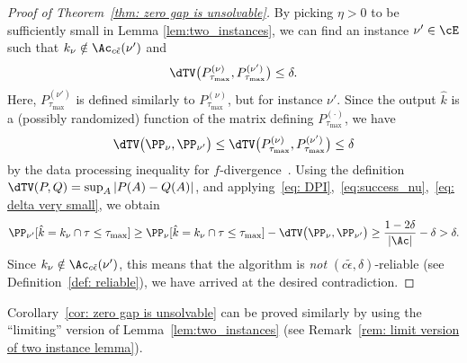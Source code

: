 \begin{proof}[Proof of Theorem~\ref{thm: zero gap is unsolvable}]
By picking $\eta > 0$ to be sufficiently small in Lemma \ref{lem:two_instances}, we can find an instance $\nu' \in \cE$ such that $k_{\nu} \notin \Ac_{c\tilde{\epsilon}}(\nu')$ and
\begin{equation}
    \dTV\big( P_{\tau_{\max}}^{(\nu)}, P_{\tau_{\max}}^{(\nu')} \big) \le \delta.
\end{equation}
Here, $P_{\tau_{\max}}^{(\nu')}$ is defined similarly to $P_{\tau_{\max}}^{(\nu)}$, but for instance $\nu'$.
Since the output $\hat{k}$ is a (possibly randomized) function of the matrix defining $P_{\tau_{\max}}^{(\cdot)}$, we have
 \begin{equation}
    \label{eq: DPI}
     \dTV\big(  \PP_{\nu},  \PP_{\nu'} \big) \le \dTV\big( P_{\tau_{\max}}^{(\nu)}, P_{\tau_{\max}}^{(\nu')} \big) \le \delta
 \end{equation}
 by the data processing inequality for $f$-divergence~\cite[Theorem 7.4]{polyanskiy2024information}.
Using the definition $\dTV(P,Q) = \sup_{A} |P(A) - Q(A)|$, and applying~\eqref{eq: DPI},~\eqref{eq:success_nu},~\eqref{eq: delta very small}, we obtain
\begin{equation}
    \PP_{\nu'}[\hat{k} = k_{\nu} \cap \tau \le \tau_{\max}] \ge 
    \PP_{\nu}[\hat{k} = k_{\nu} \cap \tau \le \tau_{\max}] -
    \dTV\big(  \PP_{\nu},  \PP_{\nu'} \big)  
    \ge
    \frac{1-2\delta}{|\Ac|} - \delta > \delta.
    \label{eq:failure_nu'}
\end{equation}
Since $k_{\nu} \notin \Ac_{c \tilde{\epsilon} }(\nu')$, this means that the algorithm is \emph{not} $(c\tilde{\epsilon}, \delta)$-reliable (see Definition~\ref{def: reliable}), we have arrived at the desired contradiction.
\end{proof}

Corollary~\ref{cor: zero gap is unsolvable} can be proved similarly by using the ``limiting'' version of Lemma~\ref{lem:two_instances} (see Remark~\ref{rem: limit version of two instance lemma}).


